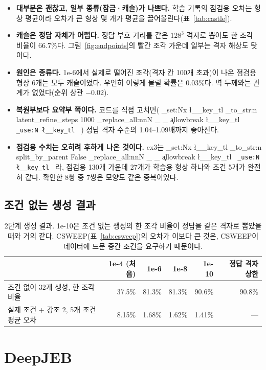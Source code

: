 \documentclass[11pt]{article}
\DeclareRobustCommand{\key}[1]{
  \tl_set:Nx \l__key_tl { \tl_to_str:n {#1} }
  \regex_replace_all:nnN { \_ } { \cO\_ \c{allowbreak} } \l__key_tl
  \texttt{ \tl_use:N \l__key_tl }
}
\begin{document}
\begin{itemize}
\item \textbf{대부분은 괜찮고, 일부 종류(잠금·캐슬)가 나쁘다.} 학습 기록의 점검용 오차는 형상 평균이라 오차가 큰 형상 몇 개가 평균을 끌어올린다(표~\ref{tab:castle}).
\item \textbf{캐슬은 정답 자체가 어렵다.} 정답 부호 거리를 같은 $128^3$ 격자로 뽑아도 한 조각 비율이 66.7\%다. 그림~\ref{fig:endpoints}의
빨간 조각 가운데 일부는 격자 해상도 탓이다.
\item \textbf{원인은 종류다.} 1e-6에서 실제로 떨어진 조각(격자 칸 100개 초과)이 나온 점검용 형상 6개는 모두 캐슬이었다.
우연히 이렇게 몰릴 확률은 0.03\%다. 벽 두께와는 관계가 없었다(순위 상관 $-0.02$).
\item \textbf{복원부보다 요약부 쪽이다.} 코드를 직접 고치면(\key{latent_refine_steps 1000}) 정답 격자 수준의 1.04--1.09배까지 좋아진다.
\item \textbf{점검용 수치는 오히려 후하게 나온 것이다.} ex3는 \key{split_by_parent False}라, 점검용 130개 가운데 27개가 학습용 형상 하나와
조건 5개가 완전히 같다. 확인한 8쌍 중 7쌍은 모양도 같은 중복이었다.
\end{itemize}

\subsection{조건 없는 생성 결과}

\begin{table}[htbp]
\centering\small
\begin{tabular}{l r r r r r}
\toprule
 & 1e-4 (처음) & 1e-6 & 1e-8 & 1e-10 & 정답 격자 상한 \\
\midrule
조건 없이 32개 생성, 한 조각 비율 & 37.5\% & 81.3\% & 81.3\% & 90.6\% & 90.8\% \\
실제 조건 + 강조 2, 5개 조건 평균 오차 & 8.15\% & 1.68\% & 1.62\% & 1.41\% & --- \\
\bottomrule
\end{tabular}
\caption{2단계 생성 결과. 1e-10은 조건 없는 생성의 한 조각 비율이 정답을 같은 격자로 뽑았을 때와 거의 같다.
CSWEEP(표~\ref{tab:csweep})의 오차가 이보다 큰 것은, CSWEEP이 데이터에 드문 중간 조건을 요구하기 때문이다.}
\label{tab:uncond}
\end{table}

\section{DeepJEB}
\label{sec:jeb}
\end{document}
